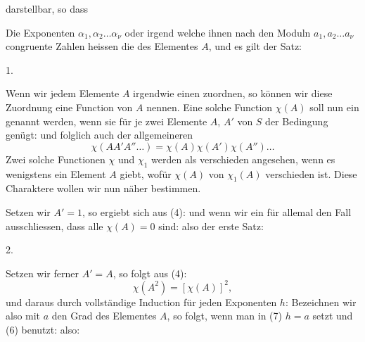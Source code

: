 
darstellbar, so dass

Die Exponenten $\alpha_1, \alpha_2 \ldots \alpha_\nu$ oder irgend welche ihnen nach
den Moduln $a_1, a_2 \ldots a_\nu$ congruente Zahlen heissen die 
des Elementes $A$, und es gilt der Satz:

1. 

Wenn wir jedem Elemente $A$ irgendwie einen 
 zuordnen, so können wir diese Zuordnung eine Function
von $A$ nennen. Eine solche Function $\chi(A)$ soll nun ein
 genannt werden, wenn sie für je zwei Elemente
 $A$, $A'$ von $S$ der Bedingung genügt:
und folglich auch der allgemeineren
\[ \chi(AA'A''\ldots) = \chi(A)\chi(A')\chi(A'')\ldots \]
Zwei solche Functionen $\chi$ und $\chi_1$ werden als verschieden
angesehen, wenn es wenigstens ein Element $A$ giebt, wofür $\chi(A)$
von $\chi_1(A)$ verschieden ist. Diese Charaktere wollen wir nun
näher bestimmen.

Setzen wir $A' = 1$, so ergiebt sich aus (4):
und wenn wir ein für allemal den Fall ausschliessen, dass alle
$\chi(A) = 0$ sind:
also der erste Satz:

2. 

Setzen wir ferner $A' = A$, so folgt aus (4):
\[ \chi(A^2) = [\chi(A)]^2, \]
und daraus durch vollständige Induction für jeden Exponenten $h$:
Bezeichnen wir also mit $a$ den Grad des Elementes $A$, so
folgt, wenn man in (7) $h = a$ setzt und (6) benutzt:
also:
